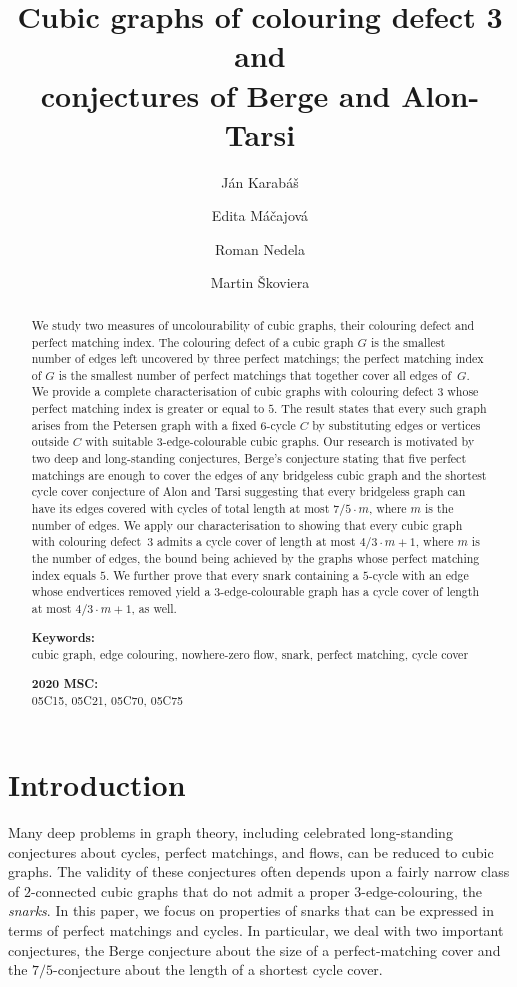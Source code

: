 \documentclass[a4paper]{amsart}
\title[Cubic
  graphs of colouring defect 3 and conjectures of Berge and
  Alon-Tarsi]{Cubic
  graphs of colouring defect 3 and\\conjectures of Berge and
  Alon-Tarsi}  %
\author[J. Karab\'a\v{s}]{J\'an Karab\'a\v{s}}
\author[E. M\'a\v cajov\'a]{Edita M\'a\v cajov\'a}
\author[R. Nedela]{Roman Nedela}
\author[M. \v Skoviera]{Martin \v Skoviera}
\theoremstyle{plain}
\theoremstyle{definition}
\begin{document}
\maketitle

\begin{abstract}
We study two measures of uncolourability of cubic graphs, their
colouring defect and perfect matching index. The colouring
defect of a cubic graph $G$ is the smallest number of edges
left uncovered by three perfect matchings; the perfect matching
index of $G$ is the smallest number of perfect matchings that
together cover all edges of~$G$. We provide a complete
characterisation of cubic graphs with colouring defect $3$
whose perfect matching index is greater or equal to $5$. The
result states that every such graph arises from the Petersen
graph with a fixed $6$-cycle $C$ by substituting edges or
vertices outside $C$ with suitable $3$-edge-colourable cubic
graphs. Our research is motivated by two deep and long-standing
conjectures, Berge's conjecture stating that five perfect
matchings are enough to cover the edges of any bridgeless cubic
graph and the shortest cycle cover conjecture of Alon and Tarsi
suggesting that every bridgeless graph can have its edges
covered with cycles of total length at most $7/5\cdot m$, where
$m$ is the number of edges. We apply our characterisation to
showing that every cubic graph with colouring defect~$3$ admits
a cycle cover of length at most $4/3\cdot m +1$, where $m$ is
the number of edges, the bound being achieved by the graphs
whose perfect matching index equals $5$. We further prove that
every snark containing a $5$-cycle with an edge whose
endvertices removed yield a $3$-edge-colourable graph has a
cycle cover of length at most $4/3\cdot m+1$, as well.

\medskip\noindent\textbf{Keywords:}\\
cubic graph, edge colouring, nowhere-zero flow, snark, perfect matching, cycle cover

\smallskip\noindent\textbf{2020 MSC:}\\
05C15, 05C21, 05C70, 05C75
\end{abstract}


\section{Introduction}
\noindent{}Many deep problems in graph theory, including
celebrated long-standing conjectures about cycles, perfect
matchings, and flows, can be reduced to cubic graphs. The
validity of these conjectures often depends upon a fairly
narrow class of $2$-connected cubic graphs that do not admit a
proper $3$-edge-colouring, the \emph{snarks}. In this paper, we
focus on properties of snarks that can be expressed in terms of
perfect matchings and cycles. In particular, we deal with two
important conjectures, the Berge conjecture about the size of a
perfect-matching cover and the $7/5$-conjecture about the
length of a shortest cycle cover.
\end{document}

